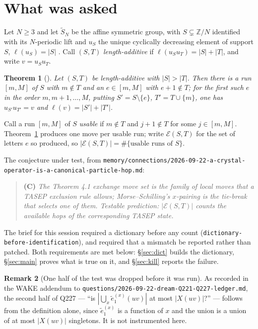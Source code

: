 \documentclass[11pt]{article}
\theoremstyle{plain}
\newtheorem{thm}{Theorem}[section]
\theoremstyle{definition}
\newtheorem{rem}[thm]{Remark}
\newcommand{\Z}{\mathbb{Z}}
\newcommand{\Saff}{\widetilde{S}_{N}}
\begin{document}
\tableofcontents

\section{What was asked}\label{sec:asked}

Let $N\ge3$ and let $\Saff$ be the affine symmetric group, with $S\subsetneq\Z/N$ identified
with its $N$-periodic lift and $u_S$ the unique cyclically decreasing element of support $S$,
$\ell(u_S)=|S|$ \cite[Lem.~2.1]{ClioExch}. Call $(S,T)$ \emph{length-additive} if
$\ell(u_Su_T)=|S|+|T|$, and write $v=u_Su_T$.

\begin{thm}[{\cite[Thm.~4.1]{ClioExch}}]\label{thm:41}
Let $(S,T)$ be length-additive with $|S|>|T|$. Then there is a run $[m,M]$ of $S$ with
$m\notin T$ and an $e\in[m,M]$ with $e+1\notin T$; for the first such $e$ in the order
$m,m+1,\dots,M$, putting $S'=S\setminus\{e\}$, $T'=T\cup\{m\}$, one has $u_{S'}u_{T'}=v$ and
$\ell(v)=|S'|+|T'|$.
\end{thm}

Call a run $[m,M]$ of $S$ \emph{usable} if $m\notin T$ and $j+1\notin T$ for some $j\in[m,M]$.
Theorem~\ref{thm:41} produces one move per usable run; write $\mathcal{E}(S,T)$ for the set of
letters $e$ so produced, so $|\mathcal{E}(S,T)|=\#\{\text{usable runs of }S\}$.

The conjecture under test, from
\texttt{memory/connections/2026-09-22-a-crystal-operator-is-a-canonical-particle-hop.md}:

\begin{quote}
\textbf{(C)} \emph{The Theorem 4.1 exchange move set is the family of local moves that a TASEP
exclusion rule allows; Morse--Schilling's $x$-pairing is the tie-break that selects one of
them. Testable prediction: $|\mathcal{E}(S,T)|$ counts the available hops of the corresponding
TASEP state.}
\end{quote}

The brief for this session required a dictionary before any count
(\texttt{dictionary-before-identification}), and required that a mismatch be reported rather
than patched. Both requirements are met below: \S\ref{sec:dict} builds the dictionary,
\S\ref{sec:main} proves what is true on it, and \S\ref{sec:kill} reports the failure.

\begin{rem}[One half of the test was dropped before it was run]
As recorded in the WAKE addendum to
\texttt{questions/2026-09-22-dream-Q221-Q227-ledger.md}, the second half of Q227 --- ``is
$|\bigcup_x\tilde e_1^{(x)}(uv)|$ at most $|X(uv)|$?'' --- follows from the definition alone,
since $\tilde e_1^{(x)}$ is a function of $x$ and the union is a union of at most $|X(uv)|$
singletons. It is not instrumented here.
\end{rem}
\end{document}

